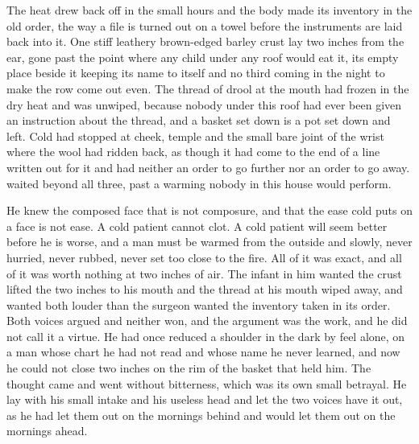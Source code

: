 The heat drew back off  in the small hours and the body made its inventory in the old order, the way a file is turned out on a towel before the instruments are laid back into it. One stiff leathery brown-edged barley crust lay two inches from the ear, gone past the point where any child under any roof would eat it, its empty place beside it keeping its name to itself and no third coming in the night to make the row come out even. The thread of drool at the mouth had frozen in the dry heat and was unwiped, because nobody under this roof had ever been given an instruction about the thread, and a basket set down is a pot set down and left. Cold had stopped at cheek, temple and the small bare joint of the wrist where the wool had ridden back, as though it had come to the end of a line written out for it and had neither an order to go further nor an order to go away.  waited beyond all three, past a warming nobody in this house would perform.

He knew the composed face that is not composure, and that the ease cold puts on a face is not ease. A cold patient cannot clot. A cold patient will seem better before he is worse, and a man must be warmed from the outside and slowly, never hurried, never rubbed, never set too close to the fire. All of it was exact, and all of it was worth nothing at two inches of air. The infant in him wanted the crust lifted the two inches to his mouth and the thread at his mouth wiped away, and wanted both louder than the surgeon wanted the inventory taken in its order. Both voices argued and neither won, and the argument was the work, and he did not call it a virtue. He had once reduced a shoulder in the dark by feel alone, on a man whose chart he had not read and whose name he never learned, and now he could not close two inches on the rim of the basket that held him. The thought came and went without bitterness, which was its own small betrayal. He lay with his small intake and his useless head and let the two voices have it out, as he had let them out on the mornings behind and would let them out on the mornings ahead.

